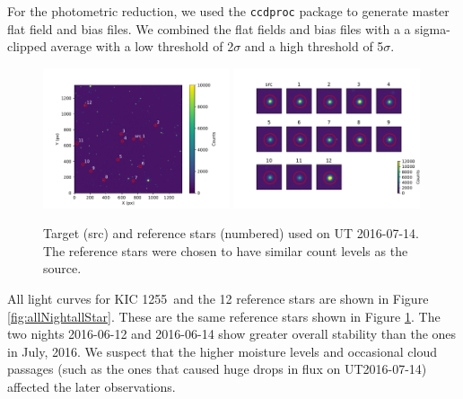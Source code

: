 \documentclass[preprint]{aastex61}
\newcommand{\shStar}{KIC 1255}
\begin{document}
For the photometric reduction, we used the \texttt{ccdproc} package to generate master flat field and bias files.
We combined the flat fields and bias files with a a sigma-clipped average with a low threshold of 2$\sigma$ and a high threshold of 5$\sigma$.

\begin{figure}
\begin{centering}
\includegraphics[width=0.49\textwidth]{images/ut2016_07_14_clouds/figure_index_152.pdf}
\includegraphics[width=0.49\textwidth]{images/stamps_kic1255_UT2016_07_14.pdf}
\caption{Target (src) and reference stars (numbered) used on UT 2016-07-14.
The reference stars were chosen to have similar count levels as the source. 
}\label{fig:refStars}
\end{centering}
\end{figure}

All light curves for \shStar\ and the 12 reference stars are shown in Figure \ref{fig:allNightallStar}.
These are the same reference stars shown in Figure \ref{fig:refStars}.
The two nights 2016-06-12 and 2016-06-14 show greater overall stability than the ones in July, 2016.
We suspect that the higher moisture levels and occasional cloud passages (such as the ones that caused huge drops in flux on UT2016-07-14) affected the later observations.
\end{document}
